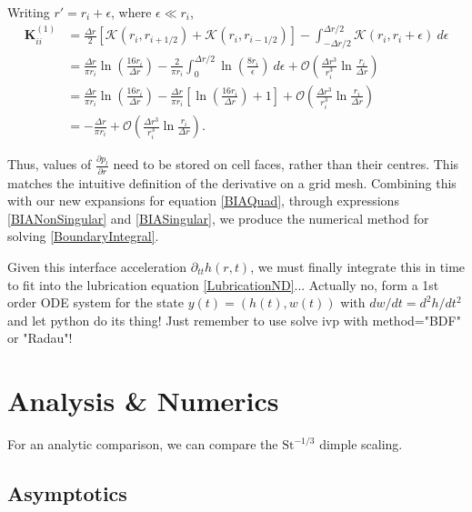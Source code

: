\documentclass[11pt,a4paper]{article}
\begin{document}
	Writing $r' = r_i + \epsilon$, where $\epsilon \ll r_i$,
	\begin{equation}
		\label{BIASingular}
		\begin{aligned}
			\mathbf{K}^{(1)}_{ii} &= \frac{\Delta r}{2}\left[\mathcal{K}(r_i,r_{i+1/2}) + \mathcal{K}(r_i,r_{i-1/2})\right] - \int^{\Delta r/2}_{-\Delta r/2} \mathcal{K}(r_i,r_i+\epsilon)\ d\epsilon \\
			&= \frac{\Delta r}{\pi r_i}\ln\left(\frac{16r_i}{\Delta r}\right) - \frac{2}{\pi r_i}\int^{\Delta r/2}_0 \ln\left(\frac{8r_i}{\epsilon}\right)\ d\epsilon + \mathcal{O}\left(\frac{\Delta r^3}{r_i^3}\ln\frac{r_i}{\Delta r}\right) \\
			&= \frac{\Delta r}{\pi r_i}\ln\left(\frac{16r_i}{\Delta r}\right) - \frac{\Delta r}{\pi r_i}\left[\ln\left(\frac{16r_i}{\Delta r}\right) + 1\right] + \mathcal{O}\left(\frac{\Delta r^3}{r_i^3}\ln\frac{r_i}{\Delta r}\right) \\
			&= -\frac{\Delta r}{\pi r_i} + \mathcal{O}\left(\frac{\Delta r^3}{r_i^3}\ln\frac{r_i}{\Delta r}\right).
		\end{aligned}
	\end{equation}
	

	Thus, values of $\frac{\partial p_l}{\partial r}$ need to be stored on cell faces, rather than their centres. This matches the intuitive definition of the derivative on a grid mesh.
	Combining this with our new expansions for equation \eqref{BIAQuad}, through expressions \eqref{BIANonSingular} and \eqref{BIASingular}, we produce the numerical method for solving \eqref{BoundaryIntegral}.
	
	Given this interface acceleration $\partial _{tt}h(r,t)$, we must finally integrate this in time to fit into the lubrication equation \eqref{LubricationND}... Actually no, form a 1st order ODE system for the state $y(t) = (h(t), w(t))$ with $dw/dt = d^2h/dt^2$ and let python do its thing! Just remember to use solve ivp with method="BDF" or "Radau"!


	
	
	\section{Analysis \& Numerics}
	For an analytic comparison, we can compare the $\text{St}^{-1/3}$ dimple scaling.
	\subsection{Asymptotics}
	
\end{document}

